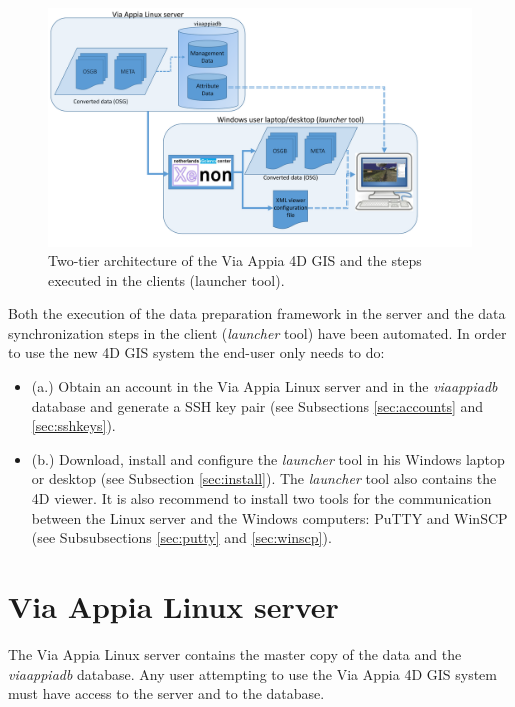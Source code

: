\documentclass[a4paper,11pt]{article}
\begin{document}
\begin{figure}[!ht]
\centering
\includegraphics[scale=0.5]{fig/communication.pdf}
\caption{Two-tier architecture of the Via Appia 4D GIS and the steps executed in the clients (launcher tool).}
\label{fig-communication}
\end{figure}

Both the execution of the data preparation framework in the server and the data synchronization steps in the client (\textit{launcher} tool) have been automated. In order to use the new 4D GIS system the end-user only needs to do:
\begin{itemize}
\item (a.) Obtain an account in the Via Appia Linux server and in the \textit{viaappiadb} database and generate a SSH key pair (see Subsections \ref{sec:accounts} and \ref{sec:sshkeys}).
\item (b.) Download, install and configure the \textit{launcher} tool in his Windows laptop or desktop (see Subsection \ref{sec:install}).  The \textit{launcher} tool also contains the 4D viewer. It is also recommend to install two tools for the communication between the Linux server and the Windows computers: PuTTY and WinSCP (see Subsubsections \ref{sec:putty} and \ref{sec:winscp}).
\end{itemize}

\section{Via Appia Linux server}
\label{sec:server}

The Via Appia Linux server contains the master copy of the data and the \textit{viaappiadb} database. Any user attempting to use the Via Appia 4D GIS system must have access to the server and to the database.
\end{document}
